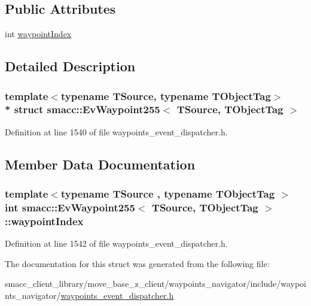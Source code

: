 \subsection*{Public Attributes}
\begin{DoxyCompactItemize}
\item 
int \hyperlink{structsmacc_1_1EvWaypoint255_a41d3501e4904fe3d53e005ecb6dd768c}{waypoint\+Index}
\end{DoxyCompactItemize}


\subsection{Detailed Description}
\subsubsection*{template$<$typename T\+Source, typename T\+Object\+Tag$>$\\*
struct smacc\+::\+Ev\+Waypoint255$<$ T\+Source, T\+Object\+Tag $>$}



Definition at line 1540 of file waypoints\+\_\+event\+\_\+dispatcher.\+h.



\subsection{Member Data Documentation}
\subsubsection[{\texorpdfstring{waypoint\+Index}{waypointIndex}}]{\setlength{\rightskip}{0pt plus 5cm}template$<$typename T\+Source , typename T\+Object\+Tag $>$ int {\bf smacc\+::\+Ev\+Waypoint255}$<$ T\+Source, T\+Object\+Tag $>$\+::waypoint\+Index}\hypertarget{structsmacc_1_1EvWaypoint255_a41d3501e4904fe3d53e005ecb6dd768c}{}\label{structsmacc_1_1EvWaypoint255_a41d3501e4904fe3d53e005ecb6dd768c}


Definition at line 1542 of file waypoints\+\_\+event\+\_\+dispatcher.\+h.



The documentation for this struct was generated from the following file\+:\begin{DoxyCompactItemize}
\item 
smacc\+\_\+client\+\_\+library/move\+\_\+base\+\_\+z\+\_\+client/waypoints\+\_\+navigator/include/waypoints\+\_\+navigator/\hyperlink{waypoints__event__dispatcher_8h}{waypoints\+\_\+event\+\_\+dispatcher.\+h}\end{DoxyCompactItemize}
